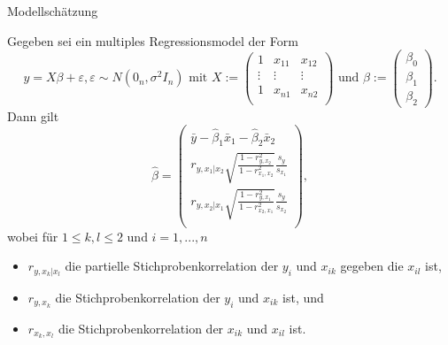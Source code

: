 \documentclass[
  8pt,
  ignorenonframetext,
]{beamer}
\begin{document}
\begin{frame}{Modellschätzung}
\protect\hypertarget{modellschuxe4tzung-15}{}
\footnotesize
\begin{theorem}
\justifying
\normalfont
Gegeben sei ein multiples Regressionsmodel der Form
\begin{equation}
y = X\beta + \varepsilon, \varepsilon \sim N(0_n,\sigma^2I_n)
\mbox{ mit }
X
:=
\begin{pmatrix}
1      & x_{11} & x_{12} \\
\vdots & \vdots & \vdots \\
1      & x_{n1} & x_{n2} \\
\end{pmatrix}
\mbox{ und }
\beta
:=
\begin{pmatrix}
\beta_0 \\
\beta_1 \\
\beta_2
\end{pmatrix}.
\end{equation}
Dann gilt
\begin{equation}
\hat{\beta}
=
\begin{pmatrix}
\bar{y} - \hat{\beta}_1\bar{x}_1 - \hat{\beta}_2\bar{x}_2     \\
r_{y,x_1|x_2}\sqrt{\frac{1-r^2_{y,x_2}}{\,1-r_{x_1,x_2}^2}}\frac{s_{y}}{s_{x_1}} \\
r_{y,x_2|x_1}\sqrt{\frac{1-r^2_{y,x_1}}{\,1-r_{x_2,x_1}^2}}\frac{s_{y}}{s_{x_2}} \\
\end{pmatrix},
\end{equation}
wobei für $1 \le k,l \le 2$ und $i = 1,...,n$
\begin{itemize}
\item $r_{y,x_k|x_l}$ die partielle Stichprobenkorrelation der  $y_i$ und $x_{ik}$ gegeben die $x_{il}$ ist,
\item $r_{y,x_k}$ die Stichprobenkorrelation der $y_i$ und $x_{ik}$ ist, und
\item $r_{x_k,x_l}$ die Stichprobenkorrelation der $x_{ik}$ und $x_{il}$ ist.
\end{itemize}
\end{theorem}
\end{frame}
\end{document}
